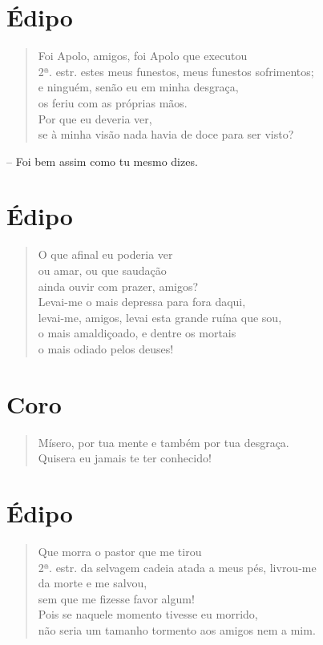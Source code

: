 \section{Édipo} 

\begin{verse}Foi Apolo, amigos, foi Apolo que executou\\ 2ª. estr.
estes meus funestos, meus funestos sofrimentos;\\ 
e ninguém, senão eu em minha desgraça,\\
os feriu com as próprias mãos.\\
Por que eu deveria ver,\\
se à minha visão nada havia de doce para ser visto?
\end{verse}

 --   Foi bem assim como tu mesmo dizes.

\section{Édipo} 

\begin{verse}O que afinal eu poderia ver\\
ou amar, ou que saudação\\
ainda ouvir com prazer, amigos?\\ 
Levai-me o mais depressa para fora daqui,\\
levai-me, amigos, levai esta grande ruína que sou,\\
o mais amaldiçoado, e dentre os mortais\\
o mais odiado pelos deuses!
\end{verse}


\section{Coro} 

\begin{verse}Mísero, por tua mente e também por tua desgraça.\\
Quisera eu jamais te ter conhecido!
\end{verse}

\section{Édipo} 

\begin{verse}Que morra o pastor que me tirou\\ 2ª. estr.
da selvagem cadeia atada a meus pés, livrou-me\\ 
da morte e me salvou,\\
sem que me fizesse favor algum!\\
Pois se naquele momento tivesse eu morrido,\\
não seria um tamanho tormento aos amigos nem a mim.
\end{verse}

